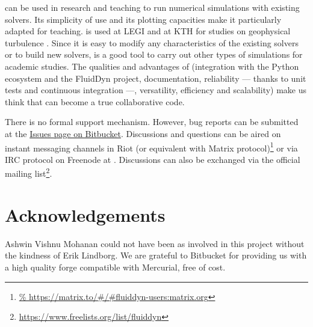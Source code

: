 \documentclass{../jors}
\begin{document}

 can be used in research and teaching to run numerical simulations
with existing solvers.
%
Its simplicity of use and its plotting capacities make it particularly adapted for
teaching.
%
 is used at LEGI and at KTH for studies on geophysical turbulence
\cite[see for example][]{LindborgMohanan2017}.
%
Since it is easy to modify any characteristics of the existing solvers or to build
new solvers,  is a good tool to carry out other types of
simulations for academic studies.
%
The qualities and advantages of  (integration with the Python
ecosystem and the FluidDyn project, documentation, reliability --- thanks to unit tests
and continuous integration ---, versatility, efficiency and scalability) make us think
that  can become a true collaborative code.

There is no formal support mechanism. However, bug reports can be submitted at
the \href{https://bitbucket.org/fluiddyn/fluidsim/issues}{Issues page on
Bitbucket}. Discussions and questions can be aired on instant messaging
channels in Riot (or equivalent with Matrix protocol)\footnote{
\url{%
  https://matrix.to/\#/\#fluiddyn-users:matrix.org}}
or via IRC protocol on Freenode at . Discussions
can also be exchanged via the official mailing list\footnote{
\url{https://www.freelists.org/list/fluiddyn}}.

\section*{Acknowledgements}


Ashwin Vishnu Mohanan could not have been as involved in this project without the
kindness of Erik Lindborg.
%
We are grateful to Bitbucket for providing us with a high quality forge
compatible with Mercurial, free of cost.
\end{document}
